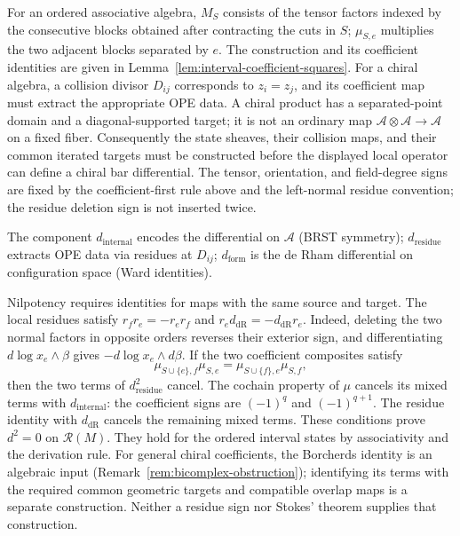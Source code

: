\begin{definition}
For an ordered associative algebra, $M_S$ consists of the tensor factors indexed
by the consecutive blocks obtained after contracting the cuts in $S$;
$\mu_{S,e}$ multiplies the two adjacent blocks separated by $e$.
The construction and its coefficient identities are given in
Lemma~\ref{lem:interval-coefficient-squares}.
For a chiral algebra, a collision divisor $D_{ij}$ corresponds to $z_i=z_j$,
and its coefficient map must extract the appropriate OPE data.
A chiral product has a separated-point domain and a diagonal-supported target;
it is not an ordinary map $\mathcal A\otimes\mathcal A\to\mathcal A$ on a fixed fiber.
Consequently the state sheaves, their collision maps, and their common iterated targets
must be constructed before the displayed local operator can define a chiral bar differential.
The tensor, orientation, and field-degree signs are fixed by the coefficient-first rule above
and the left-normal residue convention; the residue deletion sign is not inserted twice.

\end{definition}

\begin{remark}\label{rem:three-components}
The component $d_{\text{internal}}$ encodes the differential on $\mathcal{A}$ (BRST symmetry); $d_{\text{residue}}$ extracts OPE data via residues at $D_{ij}$; $d_{\text{form}}$ is the de Rham differential on configuration space (Ward identities).

Nilpotency requires identities for maps with the same source and target.
The local residues satisfy $r_f r_e=-r_e r_f$ and
$r_e d_{\mathrm{dR}}=-d_{\mathrm{dR}}r_e$.
Indeed, deleting the two normal factors in opposite orders reverses their exterior sign,
and differentiating $d\log x_e\wedge\beta$ gives $-d\log x_e\wedge d\beta$.
If the two coefficient composites satisfy
\[
\mu_{S\cup\{e\},f}\mu_{S,e}
=\mu_{S\cup\{f\},e}\mu_{S,f},
\]
then the two terms of $d_{\mathrm{residue}}^2$ cancel.
The cochain property of $\mu$ cancels its mixed terms with $d_{\mathrm{internal}}$:
the coefficient signs are $(-1)^q$ and $(-1)^{q+1}$.
The residue identity with $d_{\mathrm{dR}}$ cancels the remaining mixed terms.
These conditions prove $d^2=0$ on $\mathcal R(M)$.
They hold for the ordered interval states by associativity and the derivation rule.
For general chiral coefficients, the Borcherds identity is an algebraic input
(Remark~\ref{rem:bicomplex-obstruction}); identifying its terms with the required
common geometric targets and compatible overlap maps is a separate construction.
Neither a residue sign nor Stokes' theorem supplies that construction.
\end{remark}

